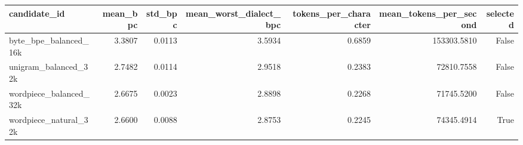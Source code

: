 \begin{tabular}{lrrrrrr}
\toprule
candidate\_id & mean\_bpc & std\_bpc & mean\_worst\_dialect\_bpc & tokens\_per\_character & mean\_tokens\_per\_second & selected \\
\midrule
byte\_bpe\_balanced\_16k & 3.3807 & 0.0113 & 3.5934 & 0.6859 & 153303.5810 & False \\
unigram\_balanced\_32k & 2.7482 & 0.0114 & 2.9518 & 0.2383 & 72810.7558 & False \\
wordpiece\_balanced\_32k & 2.6675 & 0.0023 & 2.8898 & 0.2268 & 71745.5200 & False \\
wordpiece\_natural\_32k & 2.6600 & 0.0088 & 2.8753 & 0.2245 & 74345.4914 & True \\
\bottomrule
\end{tabular}
